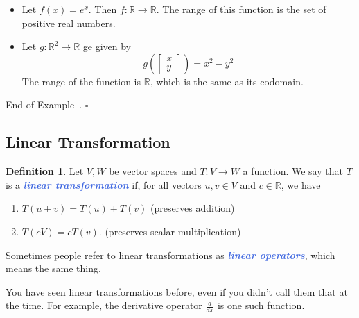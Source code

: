 \documentclass[10pt]{article}
\newcommand{\demph}[1]{\textcolor{RoyalBlue}{\textbf{\slshape #1}}} %
\theoremstyle{definition}
\newtheorem{definition}[theorem]{Definition}
\newtheorem{example}[theorem]{Example}
\renewenvironment{example}
{\begin{oldexample}}
  {\par\smallskip\hfill   End of Example~\theexample. $\square$    \par\end{oldexample}}
\newcommand{\R}{\mathbb{R}}           %
\begin{document}
\begin{example}
  \begin{itemize}
    \item Let $f(x) = e^{x}$. Then $f: \R \to \R$. The range of this function is the
    set of positive real numbers.
    \item Let $g: \R^{2} \to \R$ ge given by
    \begin{equation*}
      g \left(
        \begin{bmatrix}
          x\\y
        \end{bmatrix}
      \right)  = x^{2}-y^{2}
    \end{equation*}
    The range of the function is $\R$, which is the same as its codomain.
  \end{itemize}
\end{example}

\subsection{Linear Transformation}
\begin{definition}
  Let $V,W$ be vector spaces and $T:V \to W$ a function. We say that $T$ is a
  \demph{linear transformation} if, for all vectors $u,v\in V$ and $c\in \R$,
  we have
  \begin{enumerate}[label=(\roman*)]
    \item $T(u+v)= T(u)+T(v) $ \quad (preserves addition)
    \item $T(cV)= cT(v)$.  \quad (preserves scalar multiplication)
  \end{enumerate}
  Sometimes people refer to linear transformations as \demph{linear
    operators}, which means the same thing.
\end{definition}

You have seen linear transformations before, even if you didn't call them that
at the time. For example, the derivative operator $\frac{d}{dx}$ is one such
function.
\end{document}
